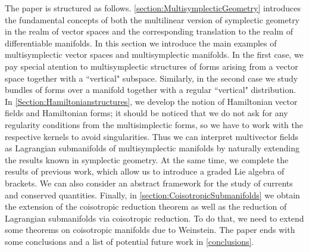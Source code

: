 The paper is structured as follows. \cref{section:MultisymplecticGeometry} introduces the fundamental concepts of both the multilinear version of symplectic geometry in the realm of vector spaces and the corresponding translation to the realm of differentiable manifolds. In this section we introduce the main examples of multisymplectic vector spaces and multisymplectic manifolds. In the first case, we pay special atention to multisymplectic structures of forms arising from a vector space together with a ``vertical" subspace. Similarly, in the second case we study bundles of forms over a manifold together with a regular ``vertical" distribution. In \cref{Section:Hamiltonianstructures}, we develop the notion of Hamiltonian vector fields and Hamiltonian forms; it should be noticed that we do not ask for any regularity conditions from the multisimplectic forms, so we have to work with the respective kernels to avoid singularities. Thus we can interpret multivector fields as Lagrangian submanifolds of multisymplectic manifolds by naturally extending the results known in symplectic geometry. At the same time, we complete the results of previous work, which allow us to introduce a graded Lie algebra of brackets. We can also consider an abstract framework for the study of currents and conserved quantities. Finally, in \cref{section:CoisotropicSubmanifolds} we obtain the extension of the coisotropic reduction theorem as well as the reduction of Lagrangian submanifolds via coisotropic reduction. To do that, we need to extend some theorems on coisotropic manifolds due to Weinstein. The paper ends with some conclusions and a list of potential future work in \cref{conclusions}.